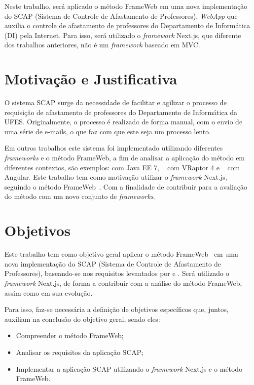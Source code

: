 Neste trabalho, será aplicado o método FrameWeb em uma nova implementação do SCAP (Sistema de Controle de Afastamento de Professores), 
\textit{WebApp} que auxilia o controle de afastamento de professores do Departamento de Informática (DI) 
pela Internet. Para isso, será utilizado o \textit{framework} Next.js, que diferente dos trabalhos anteriores, 
não é um \textit{framework} baseado em MVC.


\section{Motivação e Justificativa}
\label{sec-intro-motjus}

O sistema SCAP surge da necessidade de facilitar e agilizar o processo de requisição de afastamento de 
professores do Departamento de Informática da UFES. Originalmente, o processo é realizado 
de forma manual, com o envio de uma série de e-mails, o que faz com que este seja um processo lento.

Em outros trabalhos este sistema foi implementado utilizando diferentes \textit{frameworks} e o método FrameWeb, a fim de analisar a aplicação do método em diferentes contextos, são exemplos:  com Java EE 7, ~ com VRaptor 4 e ~ com Angular. 
Este trabalho tem como motivação utilizar o \textit{framework} Next.js, seguindo o método FrameWeb~\cite{souza:2007}. Com a finalidade de contribuir para a avaliação do método com um novo conjunto de \textit{frameworks}.


\section{Objetivos}
\label{sec-intro-obj}

Este trabalho tem como objetivo geral aplicar o método FrameWeb~\cite{souza:2007} em uma nova implementação do SCAP (Sistema de Controle de Afastamento de Professores),
baseando-se nos requisitos levantados por \cite{duarte:2014} e \cite{prado:2015}. Será utilizado o \textit{framework} Next.js, de forma a contribuir com a análise do método FrameWeb, assim como em sua evolução.

Para isso, faz-se necessária a definição de objetivos específicos que, juntos, auxiliam na conclusão do objetivo geral, sendo eles:
\begin{itemize}
    \item Compreender o método FrameWeb;
    \item Analisar os requisitos da aplicação SCAP;
    \item Implementar a aplicação SCAP utilizando o \textit{framework} Next.js e o método FrameWeb.
\end{itemize}


